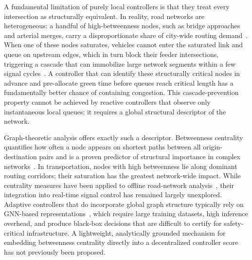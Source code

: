 \documentclass[letterpaper, conference]{IEEEtran}
\begin{document}
A fundamental limitation of purely local controllers is that they treat every intersection as structurally equivalent. In reality, road networks are heterogeneous: a handful of high-betweenness nodes, such as bridge approaches and arterial merges, carry a disproportionate share of city-wide routing demand~\cite{newman2010networks}. When one of these nodes saturates, vehicles cannot enter the saturated link and queue on upstream edges, which in turn block their feeder intersections, triggering a cascade that can immobilize large network segments within a few signal cycles~\cite{daganzo1994queue}. A controller that can identify these structurally critical nodes in advance and pre-allocate green time before queues reach critical length has a fundamentally better chance of containing congestion. This cascade-prevention property cannot be achieved by reactive controllers that observe only instantaneous local queues; it requires a global structural descriptor of the network.

Graph-theoretic analysis offers exactly such a descriptor. Betweenness centrality quantifies how often a node appears on shortest paths between all origin-destination pairs and is a proven predictor of structural importance in complex networks~\cite{freeman1977set, brandes2001centrality}. In transportation, nodes with high betweenness lie along dominant routing corridors; their saturation has the greatest network-wide impact. While centrality measures have been applied to offline road-network analysis~\cite{wang2015graph}, their integration into real-time signal control has remained largely unexplored. Adaptive controllers that do incorporate global graph structure typically rely on GNN-based representations~\cite{zhang2021trafficgcn}, which require large training datasets, high inference overhead, and produce black-box decisions that are difficult to certify for safety-critical infrastructure. A lightweight, analytically grounded mechanism for embedding betweenness centrality directly into a decentralized controller score has not previously been proposed.
\end{document}
